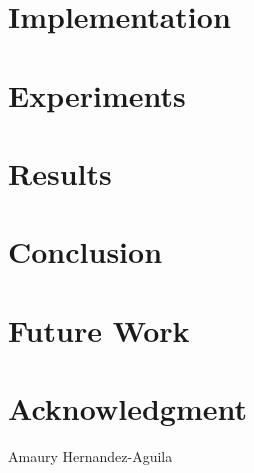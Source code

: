 \documentclass{ieeeaccess}
\begin{document}
\section{Implementation}
\label{section:implementation}

\section{Experiments}
\label{section:experiments}

\section{Results}
\label{section:results}

\section{Conclusion}
\label{section:conclusion}

\section{Future Work}
\label{section:future-work}

\section*{Acknowledgment}

\begin{IEEEbiography}{Amaury
  Hernandez-Aguila} 
\end{IEEEbiography}




\EOD
\end{document}
